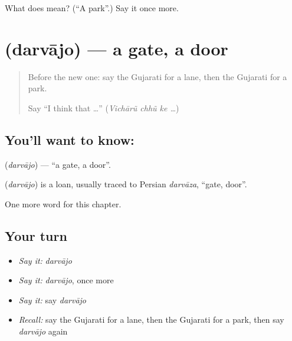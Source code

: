 \begin{tcolorbox}[breakable,colback=teal!4,colframe=teal!35!black,title={Before you move on}]
What does  mean? (\textquotedblleft{}A park\textquotedblright{}.) Say it once more.
\end{tcolorbox}
\section[\texorpdfstring{\gu{દરવાજો} (darvājo)}{દરવાજો (darvājo)}]{ (darvājo) — a gate, a door}

\label{lesson:GU-C129-darvajo}



\begin{quote}
Before the new one: say the Gujarati for a lane, then the Gujarati for a park.

Say \textquotedblleft{}I think that …\textquotedblright{} (\emph{Vichārũ chhũ ke …})
\end{quote}

\subsection*{You'll want to know: }
\textbf{} (\emph{darvājo}) — \textquotedblleft{}a gate, a door\textquotedblright{}.

\begin{cousinweb}
\textbf{} (\emph{darvājo}) is a loan, usually traced to Persian \emph{darvāza}, \textquotedblleft{}gate, door\textquotedblright{}.
\end{cousinweb}

\begin{grammarlens}[title={What you've built}]
One more word for this chapter.
\end{grammarlens}

\subsection*{Your turn}
\begin{itemize}
\raggedright
  \item \emph{Say it:} \emph{darvājo}
  \item \emph{Say it:} \emph{darvājo}, once more
  \item \emph{Say it:} say \emph{darvājo}
  \item \emph{Recall:} say the Gujarati for a lane, then the Gujarati for a park, then say \emph{darvājo} again
\end{itemize}

